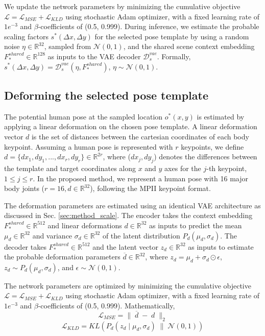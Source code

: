 We update the network parameters by minimizing the cumulative objective $\mathcal{L} = \mathcal{L}_{MSE} + \mathcal{L}_{KLD}$ using stochastic Adam optimizer, with a fixed learning rate of $1e^{-3}$ and $\beta$-coefficients of (0.5, 0.999). During inference, we estimate the probable scaling factors $s^*(\Delta x, \Delta y)$ for the selected pose template by using a random noise $\eta \in \mathbb{R}^{32}$, sampled from $\mathcal{N}(0, 1)$, and the shared scene context embedding $F^{shared}_* \in \mathbb{R}^{128}$ as inputs to the VAE decoder $\mathcal{D}^{vae}_s$. Formally, $s^*(\Delta x, \Delta y) = \mathcal{D}^{vae}_s(\eta, F^{shared}_*)$, $\eta \sim \mathcal{N}(0, 1)$.

\subsection{Deforming the selected pose template}
\label{sec:method_deform}
The potential human pose at the sampled location $o^*(x, y)$ is estimated by applying a linear deformation on the chosen pose template. A linear deformation vector $d$ is the set of distances between the cartesian coordinates of each body keypoint. Assuming a human pose is represented with $r$ keypoints, we define $d = \{dx_1, dy_1, ..., dx_r, dy_r\} \in \mathbb{R}^{2r}$, where ($dx_j, dy_j$) denotes the differences between the template and target coordinates along $x$ and $y$ axes for the $j$-th keypoint, $1 \leqslant j \leqslant r$. In the proposed method, we represent a human pose with 16 major body joints ($r = 16, d \in \mathbb{R}^{32}$), following the MPII \cite{andriluka142d} keypoint format.

The deformation parameters are estimated using an identical VAE architecture as discussed in Sec. \ref{sec:method_scale}. The encoder takes the context embedding $F^{shared}_* \in \mathbb{R}^{512}$ and linear deformations $d \in \mathbb{R}^{32}$ as inputs to predict the mean $\mu_d \in \mathbb{R}^{32}$ and variance $\sigma_d \in \mathbb{R}^{32}$ of the latent distribution $P_d(\mu_d, \sigma_d)$. The decoder takes $F^{shared}_* \in \mathbb{R}^{512}$ and the latent vector $z_d \in \mathbb{R}^{32}$ as inputs to estimate the probable deformation parameters $\overline{d} \in \mathbb{R}^{32}$, where $z_d = \mu_d + \sigma_d \odot \epsilon$, $z_d \sim P_d(\mu_d, \sigma_d)$, and $\epsilon \sim \mathcal{N}(0, 1)$.

The network parameters are optimized by minimizing the cumulative objective $\mathcal{L} = \mathcal{L}_{MSE} + \mathcal{L}_{KLD}$ using stochastic Adam optimizer, with a fixed learning rate of $1e^{-3}$ and $\beta$-coefficients of (0.5, 0.999). Mathematically,
\[
\mathcal{L}_{MSE} = \| \; \overline{d} \; - \; d \; \|_2
\]
\[
\mathcal{L}_{KLD} = KL \left( P_d(z_d \; | \; \mu_d, \sigma_d) \; \| \; \mathcal{N}(0, 1) \right)
\]

